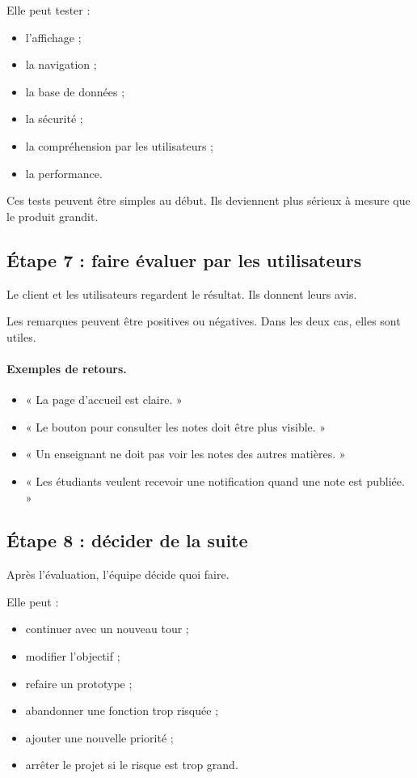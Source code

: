 \documentclass[12pt,a4paper]{article}
\begin{document}
Elle peut tester :

\begin{itemize}
    \item l'affichage ;
    \item la navigation ;
    \item la base de données ;
    \item la sécurité ;
    \item la compréhension par les utilisateurs ;
    \item la performance.
\end{itemize}

Ces tests peuvent être simples au début. Ils deviennent plus sérieux à mesure que le produit grandit.

\subsection{Étape 7 : faire évaluer par les utilisateurs}

Le client et les utilisateurs regardent le résultat. Ils donnent leurs avis.

Les remarques peuvent être positives ou négatives. Dans les deux cas, elles sont utiles.

\paragraph{Exemples de retours.}
\begin{itemize}
    \item « La page d'accueil est claire. »
    \item « Le bouton pour consulter les notes doit être plus visible. »
    \item « Un enseignant ne doit pas voir les notes des autres matières. »
    \item « Les étudiants veulent recevoir une notification quand une note est publiée. »
\end{itemize}

\subsection{Étape 8 : décider de la suite}

Après l'évaluation, l'équipe décide quoi faire.

Elle peut :

\begin{itemize}
    \item continuer avec un nouveau tour ;
    \item modifier l'objectif ;
    \item refaire un prototype ;
    \item abandonner une fonction trop risquée ;
    \item ajouter une nouvelle priorité ;
    \item arrêter le projet si le risque est trop grand.
\end{itemize}
\end{document}
